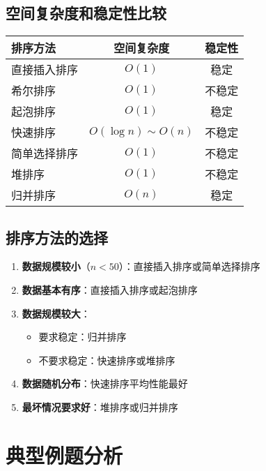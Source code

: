 \documentclass[12pt,a4paper]{amsart}
\begin{document}
\subsection{空间复杂度和稳定性比较}

\begin{center}
\begin{tabular}{|l|c|c|}
\hline
\textbf{排序方法} & \textbf{空间复杂度} & \textbf{稳定性} \\
\hline
直接插入排序 & $O(1)$ & 稳定 \\
\hline
希尔排序 & $O(1)$ & 不稳定 \\
\hline
起泡排序 & $O(1)$ & 稳定 \\
\hline
快速排序 & $O(\log n) \sim O(n)$ & 不稳定 \\
\hline
简单选择排序 & $O(1)$ & 不稳定 \\
\hline
堆排序 & $O(1)$ & 不稳定 \\
\hline
归并排序 & $O(n)$ & 稳定 \\
\hline
\end{tabular}
\end{center}

\subsection{排序方法的选择}

\begin{enumerate}
\item \textbf{数据规模较小}（$n < 50$）：直接插入排序或简单选择排序
\item \textbf{数据基本有序}：直接插入排序或起泡排序
\item \textbf{数据规模较大}：
    \begin{itemize}
    \item 要求稳定：归并排序
    \item 不要求稳定：快速排序或堆排序
    \end{itemize}
\item \textbf{数据随机分布}：快速排序平均性能最好
\item \textbf{最坏情况要求好}：堆排序或归并排序
\end{enumerate}

\section{典型例题分析}
\end{document}
